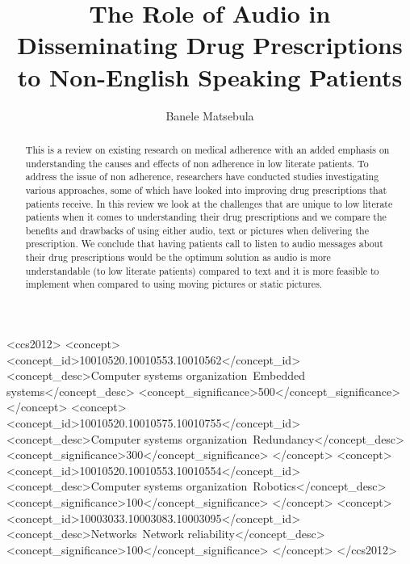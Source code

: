 \documentclass[sigplan]{acmart}
\begin{document}
\title{The Role of Audio in Disseminating Drug Prescriptions to Non-English Speaking Patients}

\author{Banele Matsebula}

\begin{abstract}
This is a review on existing research on medical adherence with an added emphasis on understanding the causes and effects of non adherence in low literate patients. To address the issue of non adherence, researchers have conducted studies investigating various approaches, some of which have looked into improving drug prescriptions that patients receive. In this review we look at the challenges that are unique to low literate patients when it comes to understanding their drug prescriptions and we compare the benefits and drawbacks of using either audio, text or pictures when delivering the prescription. We conclude that having patients call to listen to audio messages about their drug prescriptions would be the optimum solution as audio is more understandable (to low literate patients) compared to text and it is more feasible to implement when compared to using moving pictures or static pictures.
\end{abstract}

%
%
\begin{CCSXML}
<ccs2012>
 <concept>
  <concept_id>10010520.10010553.10010562</concept_id>
  <concept_desc>Computer systems organization~Embedded systems</concept_desc>
  <concept_significance>500</concept_significance>
 </concept>
 <concept>
  <concept_id>10010520.10010575.10010755</concept_id>
  <concept_desc>Computer systems organization~Redundancy</concept_desc>
  <concept_significance>300</concept_significance>
 </concept>
 <concept>
  <concept_id>10010520.10010553.10010554</concept_id>
  <concept_desc>Computer systems organization~Robotics</concept_desc>
  <concept_significance>100</concept_significance>
 </concept>
 <concept>
  <concept_id>10003033.10003083.10003095</concept_id>
  <concept_desc>Networks~Network reliability</concept_desc>
  <concept_significance>100</concept_significance>
 </concept>
</ccs2012>
\end{CCSXML}



\maketitle





\end{document}
